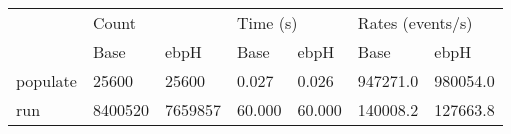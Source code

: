 \begin{tabular}{>{\ttfamily}lllllll}
\toprule
\multicolumn{1}{l}{Operation} & \multicolumn{2}{l}{Count} & \multicolumn{2}{l}{Time (s)} & \multicolumn{2}{l}{Rates (events/s)} \\
                              &     Base &     ebpH &     Base &    ebpH &             Base &      ebpH \\
\midrule
                     populate &    25600 &    25600 &    0.027 &   0.026 &         947271.0 &  980054.0 \\
                          run &  8400520 &  7659857 &   60.000 &  60.000 &         140008.2 &  127663.8 \\
\bottomrule
\end{tabular}
